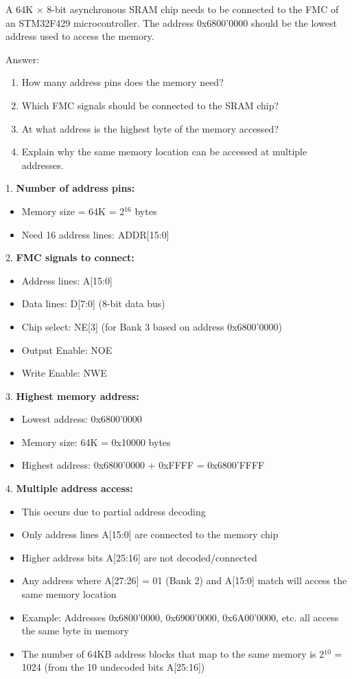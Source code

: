 \begin{example}
A 64K × 8-bit asynchronous SRAM chip needs to be connected to the FMC of an STM32F429 microcontroller. The address 0x6800'0000 should be the lowest address used to access the memory.

Answer:
\begin{enumerate}
    \item How many address pins does the memory need?
    \item Which FMC signals should be connected to the SRAM chip?
    \item At what address is the highest byte of the memory accessed?
    \item Explain why the same memory location can be accessed at multiple addresses.
\end{enumerate}

\tcblower

1. \textbf{Number of address pins:}
   \begin{itemize}
     \item Memory size = 64K = 2$^{16}$ bytes
     \item Need 16 address lines: ADDR[15:0]
   \end{itemize}

2. \textbf{FMC signals to connect:}
   \begin{itemize}
     \item Address lines: A[15:0]
     \item Data lines: D[7:0] (8-bit data bus)
     \item Chip select: NE[3] (for Bank 3 based on address 0x6800'0000)
     \item Output Enable: NOE
     \item Write Enable: NWE
   \end{itemize}

3. \textbf{Highest memory address:}
   \begin{itemize}
     \item Lowest address: 0x6800'0000
     \item Memory size: 64K = 0x10000 bytes
     \item Highest address: 0x6800'0000 + 0xFFFF = 0x6800'FFFF
   \end{itemize}

4. \textbf{Multiple address access:}
   \begin{itemize}
     \item This occurs due to partial address decoding
     \item Only address lines A[15:0] are connected to the memory chip
     \item Higher address bits A[25:16] are not decoded/connected
     \item Any address where A[27:26] = 01 (Bank 2) and A[15:0] match will access the same memory location
     \item Example: Addresses 0x6800'0000, 0x6900'0000, 0x6A00'0000, etc. all access the same byte in memory
     \item The number of 64KB address blocks that map to the same memory is 2$^{10}$ = 1024 (from the 10 undecoded bits A[25:16])
   \end{itemize}
\end{example}

